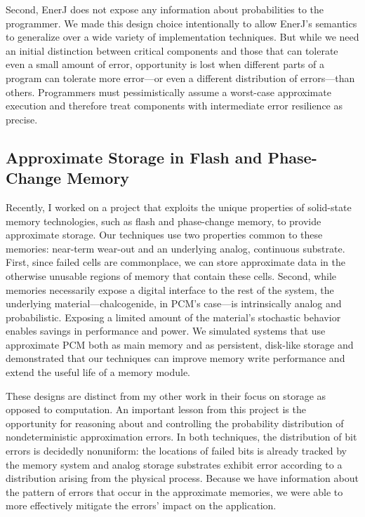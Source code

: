 Second, EnerJ does not expose any information about probabilities to the
programmer. We made this design choice intentionally to allow EnerJ's
semantics to generalize over a wide variety of implementation techniques. But
while we need an initial distinction between critical components and those
that can tolerate even a small amount of error, opportunity is lost when
different parts of a program can tolerate more error---or even a different
distribution of errors---than others. Programmers must pessimistically
assume a worst-case approximate execution and therefore treat components with
intermediate error resilience as precise.

\subsection{Approximate Storage in Flash and Phase-Change Memory}

Recently, I worked on a project that exploits the unique properties of
solid-state memory technologies, such as flash and phase-change memory,
to provide approximate storage. Our techniques use two properties common to these memories:
near-term wear-out and an underlying analog, continuous substrate. First, since
failed cells are commonplace, we can store approximate data in the otherwise
unusable regions of memory that contain these cells. Second, while memories
necessarily expose a digital interface to the rest of the system, the
underlying material---chalcogenide, in PCM's case---is intrinsically analog
and probabilistic. Exposing a limited amount of the material's stochastic
behavior enables savings in performance and power.
We simulated systems that use approximate PCM both as main memory and as
persistent, disk-like storage and demonstrated that our techniques can improve
memory write performance and extend the useful life of a memory module.

These designs are distinct from my other work in their focus on storage as
opposed to computation. An important lesson from this project is the
opportunity for reasoning about and controlling the probability distribution
of nondeterministic approximation errors. In both techniques, the distribution
of bit errors is decidedly nonuniform: the locations of failed bits is already
tracked by the memory system and analog storage substrates exhibit error
according to a distribution arising from the physical process. Because we have
information about the pattern of errors that occur in the approximate
memories, we were able to more effectively mitigate the errors' impact on the
application.

